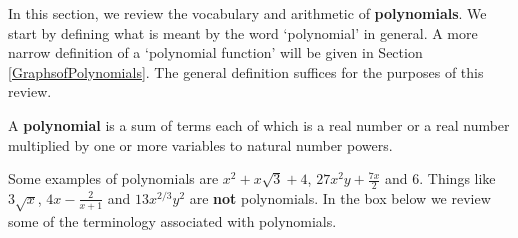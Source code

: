 \documentclass{ximera}
\begin{document}
	\author{Stitz-Zeager}




\setcounter{footnote}{0}

\label{AppPolyArith}

In this section, we review the vocabulary and arithmetic of \textbf{polynomials}. We start by defining what is meant by the word `polynomial' in general.  A more narrow definition of a `polynomial function' will be given in Section \ref{GraphsofPolynomials}.  The general definition suffices for the purposes of this review.

 


\begin{definition}  A \textbf{polynomial} is a sum of terms each of which is a real number or a real number multiplied by one or more variables to natural number powers. 
\end{definition}


 

Some examples of polynomials are $x^2 + x\sqrt{3} + 4$, $27x^2y + \frac{7x}{2}$ and $6$. Things like $3\sqrt{x}$, $4x - \frac{2}{x+1}$ and $13x^{2/3}y^{2}$ are \textbf{not} polynomials. In the box below we review some of the terminology associated with polynomials.

 

\end{document}
